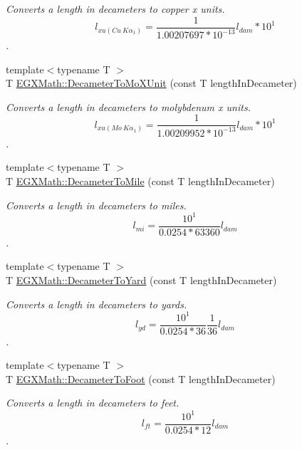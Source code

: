 \begin{DoxyCompactItemize}
\begin{DoxyCompactList}\small\item\em Converts a length in decameters to copper x units. \[ l_{xu(Cu\ K\alpha_1)}= \frac{1}{1.00207697*10^{-13}} l_{dam} * 10^{1}\]. \end{DoxyCompactList}\item 
{\footnotesize template$<$typename T $>$ }\\T \mbox{\hyperlink{group___e_g_x_math-_conversions-_length_conversions-_s_i-_decameter-_non-_s_i_ga9e345feeb2568ded9fdceaf1d23d0ca6}{E\+G\+X\+Math\+::\+Decameter\+To\+Mo\+X\+Unit}} (const T length\+In\+Decameter)
\begin{DoxyCompactList}\small\item\em Converts a length in decameters to molybdenum x units. \[ l_{xu(Mo\ K\alpha_1)}=\frac{1}{1.00209952*10^{-13}} l_{dam} * 10^{1}\]. \end{DoxyCompactList}\item 
{\footnotesize template$<$typename T $>$ }\\T \mbox{\hyperlink{group___e_g_x_math-_conversions-_length_conversions-_s_i-_decameter-_imperial_gac2a54223d869e01fc7a9c73fbf3f2906}{E\+G\+X\+Math\+::\+Decameter\+To\+Mile}} (const T length\+In\+Decameter)
\begin{DoxyCompactList}\small\item\em Converts a length in decameters to miles. \[ l_{mi}=\frac{10^{1}}{0.0254 * 63360} l_{dam} \]. \end{DoxyCompactList}\item 
{\footnotesize template$<$typename T $>$ }\\T \mbox{\hyperlink{group___e_g_x_math-_conversions-_length_conversions-_s_i-_decameter-_imperial_ga42a81b14a91ba9ddb4967faa55b6a3a0}{E\+G\+X\+Math\+::\+Decameter\+To\+Yard}} (const T length\+In\+Decameter)
\begin{DoxyCompactList}\small\item\em Converts a length in decameters to yards. \[ l_{yd}= \frac{10^{1}}{0.0254 * 36} \frac{1}{36} l_{dam} \]. \end{DoxyCompactList}\item 
{\footnotesize template$<$typename T $>$ }\\T \mbox{\hyperlink{group___e_g_x_math-_conversions-_length_conversions-_s_i-_decameter-_imperial_gad2829e03e1755db4f7f9b21070ecaef6}{E\+G\+X\+Math\+::\+Decameter\+To\+Foot}} (const T length\+In\+Decameter)
\begin{DoxyCompactList}\small\item\em Converts a length in decameters to feet. \[ l_{ft}= \frac{10^{1}}{0.0254 * 12} l_{dam} \]. \end{DoxyCompactList}\item 

\end{DoxyCompactItemize}
